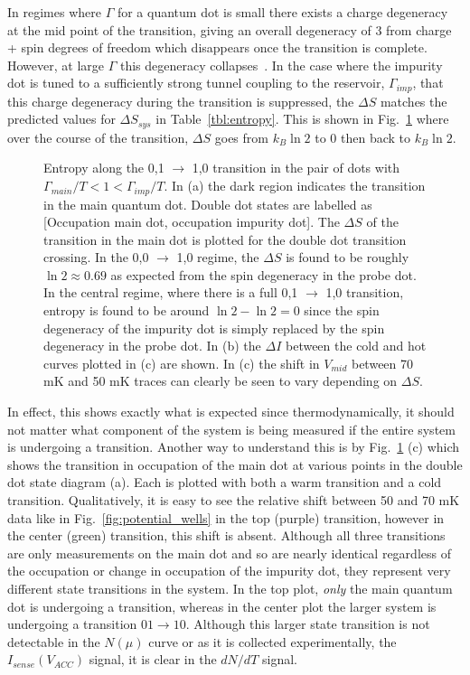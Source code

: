 In regimes where $\Gamma$ for a quantum dot is small there exists a charge degeneracy at the mid point of the transition, giving an overall degeneracy of 3 from charge + spin degrees of freedom which disappears once the transition is complete. However, at large $\Gamma$ this degeneracy collapses~\cite{PhysRevLett.82.161}. In the case where the impurity dot is tuned to a sufficiently strong tunnel coupling to the reservoir, $\Gamma_{imp}$, that this charge degeneracy during the transition is suppressed, the $\Delta S$ matches the predicted values for $\Delta S_{sys}$ in Table~\ref{tbl:entropy}. This is shown in Fig.~\ref{fig:largeg} where over the course of the transition, $\Delta S$ goes from $k_B \ln 2$ to 0 then back to $k_B \ln 2$.
\begin{figure}[h]
\centering
{}
\caption{Entropy along the 0,1 $\to$ 1,0 transition in the pair of dots with $\Gamma_{main}/T < 1 < \Gamma_{imp}/T$. In (a) the dark region indicates the transition in the main quantum dot. Double dot states are labelled as [Occupation main dot, occupation impurity dot]. The $\Delta S$ of the transition in the main dot is plotted for the double dot transition crossing. In the 0,0 $\to$ 1,0 regime, the $\Delta S$ is found to be roughly $\ln 2 \approx 0.69$ as expected from the spin degeneracy in the probe dot. In the central regime, where there is a full 0,1 $\to$ 1,0 transition, entropy is found to be around $\ln 2 - \ln2 = 0$ since the spin degeneracy of the impurity dot is simply replaced by the spin degeneracy in the probe dot. In (b) the $\Delta I$ between the cold and hot curves plotted in (c) are shown. In (c) the shift in $V_{mid}$ between 70 mK and 50 mK traces can clearly be seen to vary depending on $\Delta S$.}
\label{fig:largeg}        
\end{figure}

In effect, this shows exactly what is expected since thermodynamically, it should not matter what component of the system is being measured if the entire system is undergoing a transition. Another way to understand this is by Fig.~\ref{fig:largeg} (c) which shows the transition in occupation of the main dot at various points in the double dot state diagram (a). Each is plotted with both a warm transition and a cold transition. Qualitatively, it is easy to see the relative shift between 50 and 70 mK data like in Fig.~\ref{fig:potential_wells} in the top (purple) transition, however in the center (green) transition, this shift is absent. Although all three transitions are only measurements on the main dot and so are nearly identical regardless of the occupation or change in occupation of the impurity dot, they represent very different state transitions in the system. In the top plot, \textit{only} the main quantum dot is undergoing a transition, whereas in the center plot the larger system is undergoing a transition $01 \to 10$. Although this larger state transition is not detectable in the $N(\mu)$ curve or as it is collected experimentally, the $I_{sense} (V_{ACC})$ signal, it is clear in the $dN/dT$ signal. 

